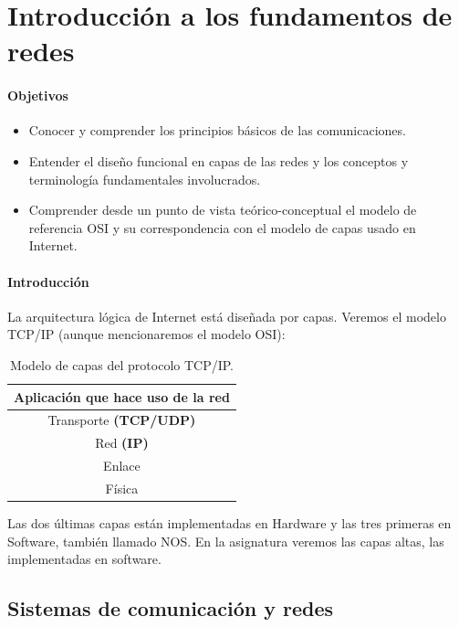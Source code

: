 \chapter{Introducción a los fundamentos de redes}
\subsubsection{Objetivos}
\begin{itemize}
    \item Conocer y comprender los principios básicos de las comunicaciones.
    \item Entender el diseño funcional en capas de las redes y los conceptos y terminología fundamentales involucrados. 
    \item Comprender desde un punto de vista teórico-conceptual el modelo de referencia \acrshort{OSI} y su correspondencia con el modelo de capas usado en Internet.
\end{itemize}

\subsubsection{Introducción}
La arquitectura lógica de Internet está diseñada por capas. Veremos el modelo TCP/IP (aunque mencionaremos el modelo \acrshort{OSI}):
\begin{table}[h]
    \centering
    \begin{tabular}{|c|}
        \hline
        Aplicación que hace uso de la red\\ \hline
        Transporte \textbf{(TCP/UDP)} \\ \hline
        Red \textbf{(IP)} \\ \hline
        Enlace \\ \hline
        Física \\ \hline
    \end{tabular}
    \caption{Modelo de capas del protocolo TCP/IP.}
    \label{table:_tabla_de_capas}
\end{table}

Las dos últimas capas están implementadas en Hardware y las tres primeras en Software, también llamado \acrfull{NOS}. En la asignatura veremos las capas altas, las implementadas en software.

\section{Sistemas de comunicación y redes}

